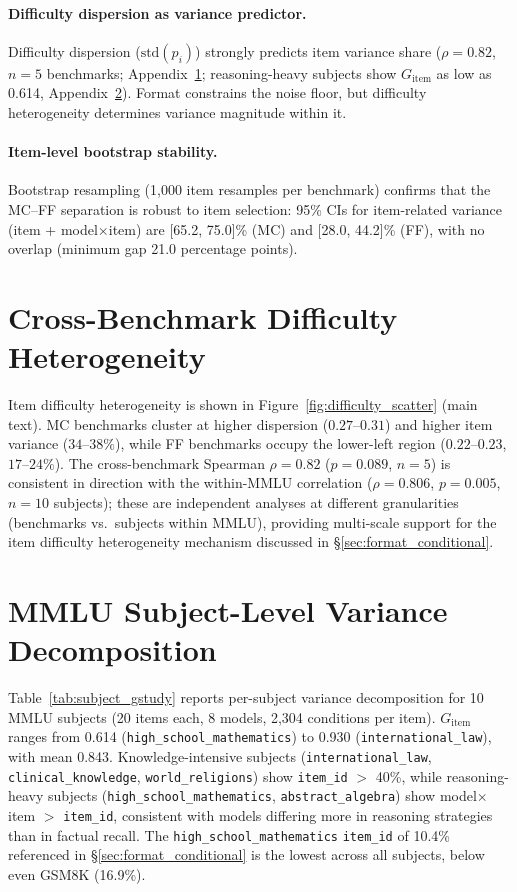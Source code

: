 \paragraph{Difficulty dispersion as variance predictor.} Difficulty dispersion ($\text{std}(p_i)$) strongly predicts item variance share ($\rho = 0.82$, $n = 5$ benchmarks; Appendix~\ref{app:difficulty_scatter}; reasoning-heavy subjects show $G_\text{item}$ as low as 0.614, Appendix~\ref{app:subject_gstudy}). Format constrains the noise floor, but difficulty heterogeneity determines variance magnitude within it.

\paragraph{Item-level bootstrap stability.} Bootstrap resampling (1,000 item resamples per benchmark) confirms that the MC--FF separation is robust to item selection: 95\% CIs for item-related variance (item + model$\times$item) are [65.2, 75.0]\% (MC) and [28.0, 44.2]\% (FF), with no overlap (minimum gap 21.0 percentage points).

\section{Cross-Benchmark Difficulty Heterogeneity}
\label{app:difficulty_scatter}

Item difficulty heterogeneity is shown in Figure~\ref{fig:difficulty_scatter} (main text). MC benchmarks cluster at higher dispersion ($0.27$--$0.31$) and higher item variance ($34$--$38\%$), while FF benchmarks occupy the lower-left region ($0.22$--$0.23$, $17$--$24\%$). The cross-benchmark Spearman $\rho = 0.82$ ($p = 0.089$, $n = 5$) is consistent in direction with the within-MMLU correlation ($\rho = 0.806$, $p = 0.005$, $n = 10$ subjects); these are independent analyses at different granularities (benchmarks vs.\ subjects within MMLU), providing multi-scale support for the item difficulty heterogeneity mechanism discussed in \S\ref{sec:format_conditional}.

\section{MMLU Subject-Level Variance Decomposition}
\label{app:subject_gstudy}

Table~\ref{tab:subject_gstudy} reports per-subject variance decomposition for 10 MMLU subjects (20 items each, 8 models, 2,304 conditions per item). $G_\text{item}$ ranges from 0.614 (\texttt{high\_school\_mathematics}) to 0.930 (\texttt{international\_law}), with mean 0.843. Knowledge-intensive subjects (\texttt{international\_law}, \texttt{clinical\_knowledge}, \texttt{world\_religions}) show \texttt{item\_id} $>$ 40\%, while reasoning-heavy subjects (\texttt{high\_school\_mathematics}, \texttt{abstract\_algebra}) show model$\times$item $>$ \texttt{item\_id}, consistent with models differing more in reasoning strategies than in factual recall. The \texttt{high\_school\_mathematics} \texttt{item\_id} of 10.4\% referenced in \S\ref{sec:format_conditional} is the lowest across all subjects, below even GSM8K (16.9\%).

